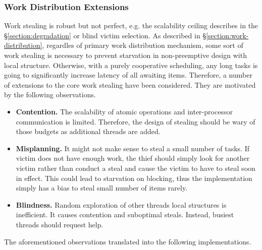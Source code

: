 \documentclass[12pt,a4paper,twoside]{report}
\begin{document}
\subsubsection{Work Distribution Extensions}
\label{section:work-distribution-extensions}

Work stealing is robust but not perfect, e.g. the scalability ceiling describes in the \S\ref{section:degradation} or blind victim selection. As described in \S\ref{section:work-distribution}, regardles of primary work distribution mechanism, some sort of work stealing is necessary to prevent starvation in non-preemptive design with local structure. Otherwise, with a purely cooperative scheduling, any long tasks is going to significantly increase latency of all awaiting items. Therefore, a number of extensions to the core work stealing have been considered. They are motivated by the following observations.

\begin{itemize}
    \item \textbf{Contention.} The scalability of atomic operations and inter-processor communication is limited. Therefore, the design of stealing should be wary of those budgets as additional threads are added. 
    \item \textbf{Misplanning.} It might not make sense to steal a small number of tasks. If victim does not have enough work, the thief should simply look for another victim rather than conduct a steal and cause the victim to have to steal soon in effect. This could lead to starvation on blocking, thus the implementation simply has a bias to steal small number of items rarely. 
    \item \textbf{Blindness.} Random exploration of other threads local structures is inefficient. It causes contention and suboptimal steals. Instead, busiest threads should request help. 
\end{itemize}


The aforementioned observations translated into the following implementations. 
\end{document}
